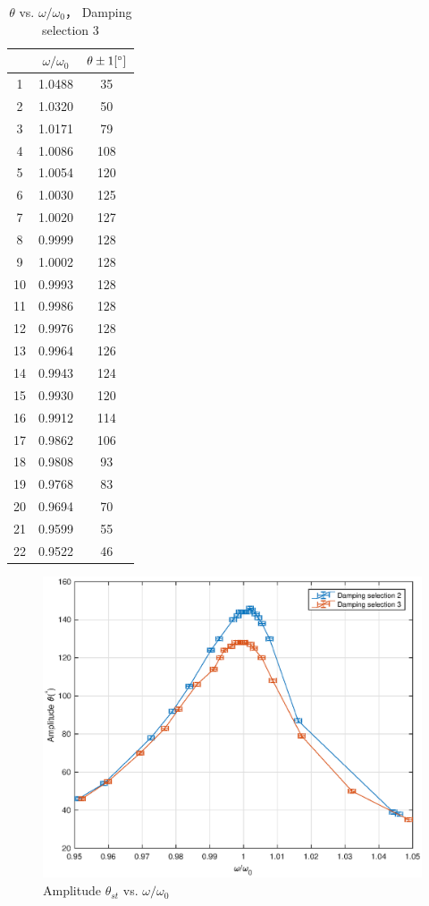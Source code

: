 \begin{table}[H]
\centering
\begin{tabular}{|c|c|c|}
\hline
& $\omega/\omega_0$ &  $\theta \pm 1 [^\circ] $ \\ \hline
1  & 1.0488   & 35   \\ \hline
2  & 1.0320   & 50   \\ \hline
3  & 1.0171   & 79   \\ \hline
4  & 1.0086   & 108  \\ \hline
5  & 1.0054   & 120  \\ \hline
6  & 1.0030   & 125  \\ \hline
7  & 1.0020   & 127  \\ \hline
8  & 0.9999   & 128  \\ \hline
9  & 1.0002   & 128  \\ \hline
10 & 0.9993   & 128  \\ \hline
11 & 0.9986   & 128  \\ \hline
12 & 0.9976   & 128  \\ \hline
13 & 0.9964   & 126  \\ \hline
14 & 0.9943   & 124  \\ \hline
15 & 0.9930   & 120  \\ \hline
16 & 0.9912   & 114  \\ \hline
17 & 0.9862   & 106  \\ \hline
18 & 0.9808   & 93   \\ \hline
19 & 0.9768   & 83   \\ \hline
20 & 0.9694   & 70   \\ \hline
21 & 0.9599   & 55   \\ \hline
22 & 0.9522   & 46   \\ \hline
\end{tabular}    
\caption{$\theta$ vs. $\omega/\omega_0$， Damping selection 3}\label{data_t3}
\end{table}

\begin{figure}[H]
\centering
\includegraphics[width=1\textwidth]{matlab/p2}
\caption{Amplitude $\theta_{st}$ vs. $\omega/\omega_0$}\label{theta}
\end{figure}